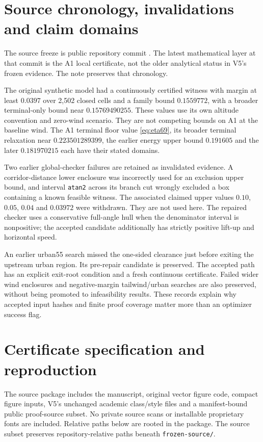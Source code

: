\section{Source chronology, invalidations and claim domains}\label{app:history}
The source freeze is public repository commit . The latest mathematical layer at that commit is the A1 local certificate, not the older analytical status in V5's frozen evidence. The note preserves that chronology.

The original synthetic model had a continuously certified witness with margin at least $0.0397$ over 2,502 closed cells and a family bound $0.1559772$, with a broader terminal-only bound near $0.15769490255$. These values use its own altitude convention and zero-wind scenario. They are not competing bounds on A1 at the baseline wind. The A1 terminal floor value \eqref{eq:eta69}, its broader terminal relaxation near $0.223501289399$, the earlier energy upper bound $0.191605$ and the later $0.181970215$ each have their stated domains.

Two earlier global-checker failures are retained as invalidated evidence. A corridor-distance lower enclosure was incorrectly used for an exclusion upper bound, and interval \texttt{atan2} across its branch cut wrongly excluded a box containing a known feasible witness. The associated claimed upper values $0.10$, $0.05$, $0.04$ and $0.03972$ were withdrawn. They are not used here. The repaired checker uses a conservative full-angle hull when the denominator interval is nonpositive; the accepted candidate additionally has strictly positive lift-up and horizontal speed.

An earlier urban55 search missed the one-sided clearance just before exiting the upstream urban region. Its pre-repair candidate is preserved. The accepted path has an explicit exit-root condition and a fresh continuous certificate. Failed wider wind enclosures and negative-margin tailwind/urban searches are also preserved, without being promoted to infeasibility results. These records explain why accepted input hashes and finite proof coverage matter more than an optimizer success flag.

\section{Certificate specification and reproduction}\label{app:reproduce}
The source package includes the manuscript, original vector figure code, compact figure inputs, V5's unchanged academic class/style files and a manifest-bound public proof-source subset. No private source scans or installable proprietary fonts are included. Relative paths below are rooted in the package. The source subset preserves repository-relative paths beneath \texttt{frozen-source/}.

